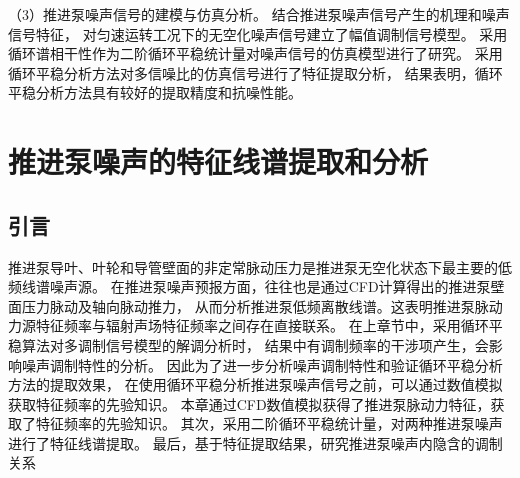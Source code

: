 （3）推进泵噪声信号的建模与仿真分析。
结合推进泵噪声信号产生的机理和噪声信号特征，
对匀速运转工况下的无空化噪声信号建立了幅值调制信号模型。
采用循环谱相干性作为二阶循环平稳统计量对噪声信号的仿真模型进行了研究。
采用循环平稳分析方法对多信噪比的仿真信号进行了特征提取分析，
结果表明，循环平稳分析方法具有较好的提取精度和抗噪性能。

\chapter{推进泵噪声的特征线谱提取和分析}
\section{引言}
\begin{comment}
由经典声学理论可知，脉动力源远场辐射噪声的声压表达式为
\begin{equation}
    \label{equ:p}
    p\left ( \mathbf{r} ,t \right ) =\frac{\mathbf{F}\cdot \mathbf{r} }{4\pi rc} =\frac{F\left ( t' \right ) }{4\pi rc}\cos \theta  
\end{equation}
式中，$t'$为迟滞时间，$\mathbf{F}$为脉动力，$r$为脉动力源到测点距离，$\theta$为与矢量之间夹角，
$\cos \theta$项用于表征脉动力源的偶极声场指向性，该式表明了脉动力源与其辐射声场之间的直接联系\cite{__2016杨琼方}。
\end{comment}
推进泵导叶、叶轮和导管壁面的非定常脉动压力是推进泵无空化状态下最主要的低频线谱噪声源\cite{__2016杨琼方}。
在推进泵噪声预报方面，往往也是通过CFD计算得出的推进泵壁面压力脉动及轴向脉动推力，
从而分析推进泵低频离散线谱。这表明推进泵脉动力源特征频率与辐射声场特征频率之间存在直接联系。
在上章节中，采用循环平稳算法对多调制信号模型的解调分析时，
结果中有调制频率的干涉项产生，会影响噪声调制特性的分析。
因此为了进一步分析噪声调制特性和验证循环平稳分析方法的提取效果，
在使用循环平稳分析推进泵噪声信号之前，可以通过数值模拟获取特征频率的先验知识。
本章通过CFD数值模拟获得了推进泵脉动力特征，获取了特征频率的先验知识。
其次，采用二阶循环平稳统计量，对两种推进泵噪声进行了特征线谱提取。
最后，基于特征提取结果，研究推进泵噪声内隐含的调制关系

\begin{comment}
    
推进泵噪声是推进泵流致激励特性的最直接的外在表现，
推进泵噪声信号中包含着丰富的运行状态和流致激励源特性，
前面章节的研究表明推进泵噪声的频谱呈现出宽带与线谱交叠的形貌，中低频线谱成分复杂，
噪声信噪比较低，特征信号如流致激励源特征频率、轴频等与其他背景噪声相比均较为微弱，
给基于传统噪声特征提取方法带来了困难，难以准确的获得推进泵的工作状态和结构信息。
上章节通过对噪声的成分分析，基于推进泵噪声的循环平稳特征，推导出流致激励源-噪声信号的幅值调制模型。
进一步为了验证从噪声信号中提取流致激励源特征的合理性和可行性，
本章节通过非定常数值模拟计算获取了多工况下推进泵的激励力信号，
分析了推进泵流致振动噪声源的关键特性，
采用循环平稳分析方法实现推进泵低频特征的提取，
联合从噪声信号中提取特征频率的结果与流致激励源的模拟结果，
从噪声信号中分析出流致激励源对噪声的影响程度以及两者的作用机理，
探究推进泵噪声的调制特性。
\end{comment}
